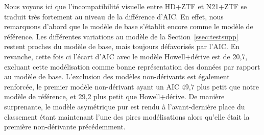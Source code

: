 \documentclass[../main/main.tex]{subfiles}
\begin{document}

Nous voyons ici que l'incompatibilité visuelle entre HD+ZTF et N21+ZTF se
traduit très fortement au niveau de la différence d'AIC. En effet, nous
remarquons d'abord que le modèle de base s'établit encore comme le modèle de
référence. Les différentes variations au modèle de la
Section~\ref{ssec:testsupp} restent proches du modèle de base, mais toujours
défavorisés par l'AIC. En revanche, cette fois ci l'écart d'AIC avec le modèle
Howell+dérive est de 20,7, excluant cette modélisation comme bonne
représentation des données par rapport au modèle de base. L'exclusion des
modèles non-dérivants est également renforcée, le premier modèle non-dérivant
ayant un AIC 49,7 plus petit que notre modèle de référence, et 29,2 plus petit
que Howell+dérive. De manière surprenante, le modèle asymétrique pur est rendu à
l'avant-dernière place du classement étant maintenant l'une des pires
modélisations alors qu'elle était la première non-dérivante précédemment.
\end{document}
